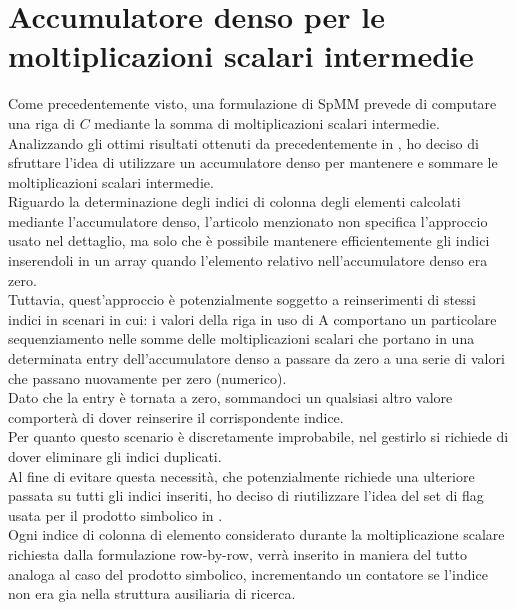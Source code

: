 \section{Accumulatore denso per le moltiplicazioni scalari intermedie} \label{chSpMMNum:scSparseVectMulPart}
Come precedentemente visto, una formulazione \rowbyrow di SpMM prevede di computare una riga di $C$ 
mediante la somma di moltiplicazioni scalari intermedie.\\
Analizzando gli ottimi risultati ottenuti da \cite{intelSpMMDenseAccumulator} precedentemente in 
, ho deciso di sfruttare l'idea di utilizzare un accumulatore denso per 
mantenere e sommare le moltiplicazioni scalari intermedie.\\
Riguardo la determinazione degli indici di colonna degli elementi \nnz calcolati mediante l'accumulatore denso,
l'articolo menzionato \cite{intelSpMMDenseAccumulator} non specifica l'approccio usato nel dettaglio, 
ma solo che è possibile mantenere efficientemente gli indici inserendoli in un array quando l'elemento relativo nell'accumulatore denso era zero.\\
Tuttavia, quest'approccio è potenzialmente soggetto a reinserimenti di stessi indici in scenari in cui:
i valori \nnz della riga in uso di A comportano un particolare sequenziamento nelle somme delle moltiplicazioni scalari che portano
in una determinata entry dell'accumulatore denso a passare da zero a una serie di valori che 
passano nuovamente per zero (numerico).\\
Dato che la entry è tornata a zero, sommandoci un qualsiasi altro valore \nnz 
comporterà di dover reinserire il corrispondente indice.\\
Per quanto questo scenario è discretamente improbabile, %
nel gestirlo si richiede di dover eliminare gli indici duplicati.\\
Al fine di evitare questa necessità, che potenzialmente richiede una ulteriore passata su tutti gli indici inseriti,
ho deciso di riutilizzare l'idea del set di flag usata per il prodotto simbolico in .\\
Ogni indice di colonna di elemento \nnz considerato durante la moltiplicazione scalare richiesta dalla formulazione row-by-row, 
verrà inserito in maniera del tutto analoga al caso del prodotto simbolico, incrementando un contatore se l'indice 
non era gia nella struttura ausiliaria di ricerca.\\
